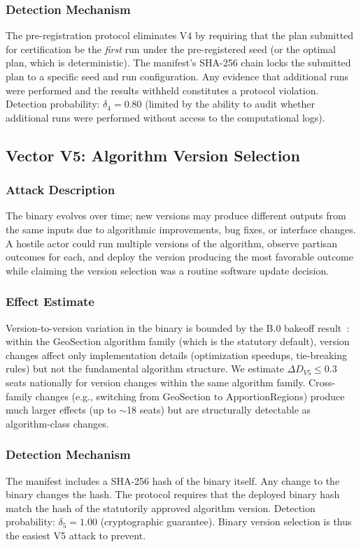 \subsubsection{Detection Mechanism}

The \dia{} pre-registration protocol eliminates V4 by requiring that the
plan submitted for certification be the \emph{first} run under the
pre-registered seed (or the \cs{} optimal plan, which is deterministic).
The manifest's SHA-256 chain locks the submitted plan to a specific seed
and run configuration.
Any evidence that additional runs were performed and the results withheld
constitutes a protocol violation.
Detection probability: $\delta_4 = 0.80$ (limited by the ability to
audit whether additional runs were performed without access to the
computational logs).

\subsection{Vector V5: Algorithm Version Selection}
\label{sec:v5}

\subsubsection{Attack Description}

The \bisect{} binary evolves over time; new versions may produce
different outputs from the same inputs due to algorithmic improvements,
bug fixes, or interface changes.
A hostile actor could run multiple versions of the algorithm, observe
partisan outcomes for each, and deploy the version producing the most
favorable outcome while claiming the version selection was a routine
software update decision.

\subsubsection{Effect Estimate}

Version-to-version variation in the \bisect{} binary is bounded by
the B.0 bakeoff result~\citep{b0paper}: within the GeoSection algorithm
family (which is the statutory default), version changes affect only
implementation details (optimization speedups, tie-breaking rules) but
not the fundamental algorithm structure.
We estimate $\Delta D_{V5} \leq 0.3$ seats nationally for version changes
within the same algorithm family.
Cross-family changes (e.g., switching from GeoSection to ApportionRegions)
produce much larger effects (up to $\sim$18 seats) but are structurally
detectable as algorithm-class changes.

\subsubsection{Detection Mechanism}

The manifest includes a SHA-256 hash of the \bisect{} binary itself.
Any change to the binary changes the hash.
The \dia{} protocol requires that the deployed binary hash match the
hash of the statutorily approved algorithm version.
Detection probability: $\delta_5 = 1.00$ (cryptographic guarantee).
Binary version selection is thus the easiest V5 attack to prevent.
